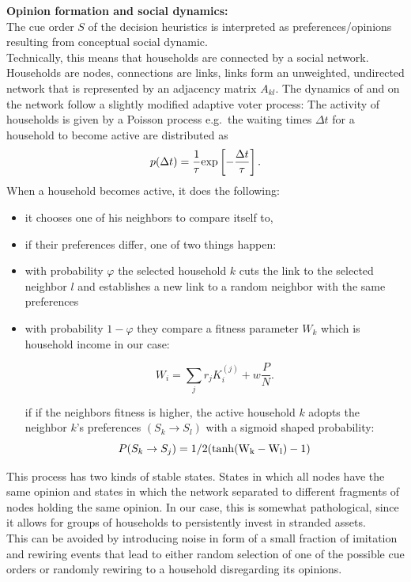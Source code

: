\textbf{Opinion formation and social dynamics:} \\
The cue order $S$ of the decision heuristics is interpreted as preferences/opinions resulting from conceptual social dynamic. \\
Technically, this means that households are connected by a social network. Households are nodes, connections are links, links form an unweighted, undirected network that is represented by an adjacency matrix $A_{kl}$.
The dynamics of and on the network follow a slightly modified adaptive voter process:
The activity of households is given by a Poisson process e.g.\ the waiting times $\Delta t$ for a household to become active are distributed as
\begin{equation}
	p(\Delta t) = \frac{1}{\tau} {\rm exp}\left[-\frac{\Delta t}{\tau} \right].
	\label{waiting_time_distribution}
\end{equation}
When a household becomes active, it does the following:
\begin{itemize}
	\item it chooses one of his neighbors to compare itself to,
	\item if their preferences differ, one of two things happen:
	\item with probability $\varphi$ the selected household $k$ cuts
		the link to the selected neighbor $l$ and establishes a new
		link to a random neighbor with the same preferences
	\item with probability $1-\varphi$ they compare a fitness parameter $W_k$
		which is household income in our case: 

		\begin{equation}
			W_i = \sum_j r_j K^{(j)}_{i} + w\frac{P}{N}.
			\label{eq:fitness}
		\end{equation}

		if if the neighbors fitness is higher, the active household $k$
		adopts the neighbor $k$'s preferences $(S_k \rightarrow S_l)$ with a sigmoid shaped 
		probability:
		\begin{equation}
			P(S_k \rightarrow S_j) = 1/2 (\rm{tanh}(W_k - W_l)-1)
			\label{imitation_probability}
		\end{equation}
\end{itemize}

This process has two kinds of stable states. States in which all nodes have the same opinion and states in which the network separated to different fragments of nodes holding the same opinion. In our case, this is somewhat pathological, since it allows for groups of households to persistently invest in stranded assets. \\
This can be avoided by introducing noise in form of a small fraction of imitation and rewiring events that lead to either random selection of one of the possible cue orders or randomly rewiring to a household disregarding its opinions.

